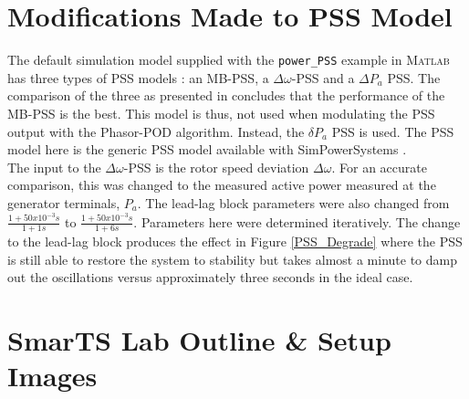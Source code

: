 \documentclass[journal]{IEEEtran}
\begin{document}
%
\section{Modifications Made to PSS Model}

The default simulation model supplied with the \texttt{power\_PSS} example in \textsc{Matlab} has three types of PSS models \cite{MATLABexample} : an MB-PSS, a $\Delta\omega $-PSS and a $\Delta P_{a}$ PSS. The comparison of the three as presented in \cite{MATLABexample} concludes that the performance of the MB-PSS is the best. This model is thus, not used when modulating the PSS output with the Phasor-POD algorithm. Instead, the $\delta P_{a}$ PSS is used. The PSS model here is the generic PSS model available with SimPowerSystems \cite{PSSDocumentation}.\\

The input to the $\Delta\omega $-PSS is the rotor speed deviation $\Delta\omega $. For an accurate comparison, this was changed to the measured active power measured at the generator terminals, $P_{a}$. The lead-lag block parameters were also changed from $\frac{1 + 50x10^{-3}s}{1 + 1s}$ to $\frac{1 + 50x10^{-3}s}{1 + 6s}$. Parameters here were determined iteratively. The change to the lead-lag block produces the effect in Figure \ref{PSS_Degrade} where the PSS is still able to restore the system to stability but takes almost a minute to damp out the oscillations versus approximately three seconds in the ideal case.\\


\section{SmarTS Lab Outline \& Setup Images}
\end{document}
